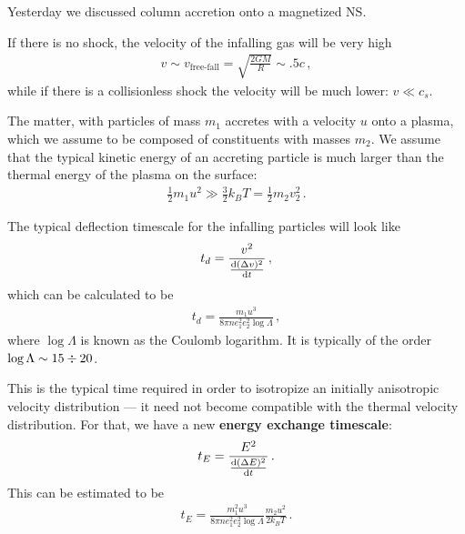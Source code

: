 \documentclass[main.tex]{subfiles}
\begin{document}

Yesterday we discussed column accretion onto a magnetized NS. 

If there is no shock, the velocity of the infalling gas will be very high
%
\begin{align}
v \sim v _{\text{free-fall}} = \sqrt{ \frac{2GM}{R}} \sim \num{.5} c
\,,
\end{align}
%
while if there is a collisionless shock the velocity will be much lower: \(v \ll c_s\).

The matter, with particles of mass \(m_1 \) accretes with a velocity \(u\) onto a plasma, which we assume to be composed of constituents with masses \(m_2 \). We assume that the typical kinetic energy of an accreting particle is much larger than the thermal energy of the plasma on the surface:
%
\begin{align}
\frac{1}{2 } m_1 u^2 \gg \frac{3}{2} k_B T = \frac{1}{2} m_2 v_2^2
\,.
\end{align}


The typical deflection timescale for the infalling particles will look like 
%
\begin{align}
t_d = \frac{v^2}{\dv{(\Delta v)^2}{t}}
\,,
\end{align}
%
which can be calculated to be 
%
\begin{align}
t_d = \frac{m_1 u^3}{8 \pi n e_1^2 e_2^2 \log \Lambda }
\,,
\end{align}
%
where \(\log \Lambda \) is known as the Coulomb logarithm. It is typically of the order \(\log \Lambda \sim 15 \divisionsymbol 20\). 

This is the typical time required in order to isotropize an initially anisotropic velocity distribution --- it need not become compatible with the thermal velocity distribution. 
For that, we have a new \textbf{energy exchange timescale}: 
%
\begin{align}
t_E = \frac{E^2}{\dv{(\Delta E)^2}{t}}
\,.
\end{align}
%
This can be estimated to be 
%
\begin{align}
t_E = \frac{m_1^2u^3}{8 \pi n e_1^2 e_2^2 \log \Lambda } \frac{m_2 u^2}{2 k_B T}
\,.
\end{align}
\end{document}
